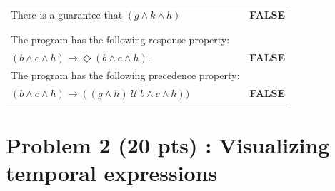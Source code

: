 \documentclass[12pt]{article}
\begin{document}
\begin{enumerate}
\begin{table}
\begin{tabular}{|l|l|}
There is a guarantee that $(g \wedge k \wedge h)$	& \textbf{FALSE}\\

&\\

\hline

&\\
		
The program has the following response property: &\\
$(b \wedge c \wedge h) \rightarrow \Diamond (b \wedge c \wedge h)$.  
 & \textbf{FALSE}\\



\hline


		
The program has the following precedence property: &\\
$(b \wedge c \wedge h) \rightarrow ( (g \wedge h) ~\mathcal{U}~ b \wedge c \wedge h))$	
 & \textbf{FALSE}\\

\hline

\end{tabular}
\end{table}


\end{enumerate}


\newpage

\section*{Problem 2 (20 pts) :  Visualizing temporal expressions}
\end{document}
